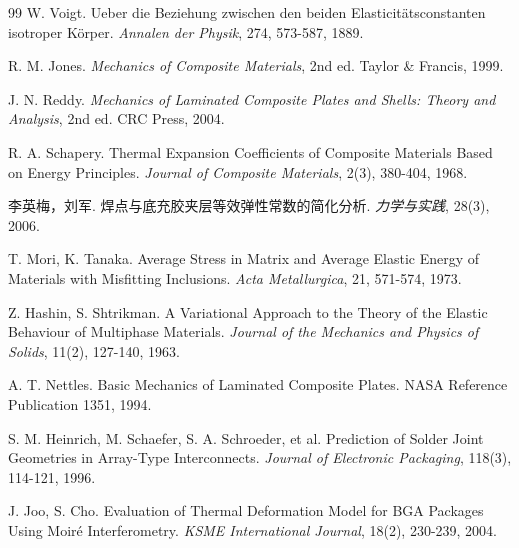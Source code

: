 \documentclass[draft,12pt,a4paper]{ctexart}
\theoremstyle{definition}
\begin{document}
\newpage
{}
\begin{thebibliography}{99}
   W. Voigt. Ueber die Beziehung zwischen den beiden Elasticit\"atsconstanten isotroper K\"orper. \textit{Annalen der Physik}, 274, 573-587, 1889. \label{ref:1}

 R. M. Jones. \textit{Mechanics of Composite Materials}, 2nd ed. Taylor \& Francis, 1999. \label{ref:2}

 J. N. Reddy. \textit{Mechanics of Laminated Composite Plates and Shells: Theory and Analysis}, 2nd ed. CRC Press, 2004. \label{ref:3}

 R. A. Schapery. Thermal Expansion Coefficients of Composite Materials Based on Energy Principles. \textit{Journal of Composite Materials}, 2(3), 380-404, 1968. \label{ref:4}

 李英梅，刘军. 焊点与底充胶夹层等效弹性常数的简化分析. \textit{力学与实践}, 28(3), 2006. \label{ref:5}

 T. Mori, K. Tanaka. Average Stress in Matrix and Average Elastic Energy of Materials with Misfitting Inclusions. \textit{Acta Metallurgica}, 21, 571-574, 1973. \label{ref:6}

 Z. Hashin, S. Shtrikman. A Variational Approach to the Theory of the Elastic Behaviour of Multiphase Materials. \textit{Journal of the Mechanics and Physics of Solids}, 11(2), 127-140, 1963. \label{ref:7}

 A. T. Nettles. Basic Mechanics of Laminated Composite Plates. NASA Reference Publication 1351, 1994. \label{ref:8}

 S. M. Heinrich, M. Schaefer, S. A. Schroeder, et al. Prediction of Solder Joint Geometries in Array-Type Interconnects. \textit{Journal of Electronic Packaging}, 118(3), 114-121, 1996. \label{ref:9}

 J. Joo, S. Cho. Evaluation of Thermal Deformation Model for BGA Packages Using Moir\'e Interferometry. \textit{KSME International Journal}, 18(2), 230-239, 2004. \label{ref:10}

\end{thebibliography}
\end{document}
